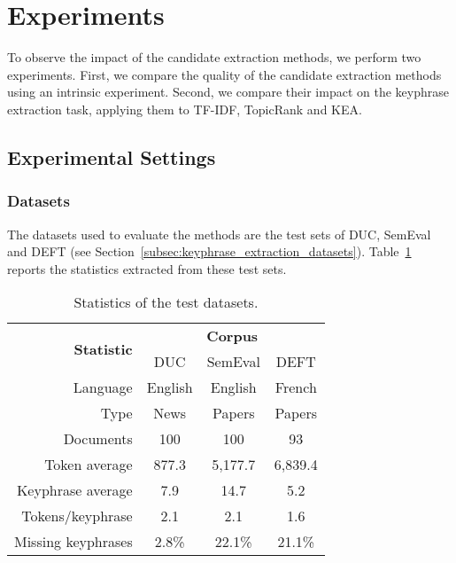 \section{Experiments}
\label{sec:evaluation}
  To observe the impact of the candidate extraction methods, we perform two
  experiments. First, we compare the quality of the candidate extraction methods
  using an intrinsic experiment. Second, we compare their impact on the
  keyphrase extraction task, applying them to TF-IDF, TopicRank and KEA.

  \subsection{Experimental Settings}
  \label{subsec:evaluation_settings}
    \subsubsection{Datasets}
    \label{subsubsec:datasets}
      The datasets used to evaluate the methods are the test sets of DUC,
      SemEval and DEFT (see Section~\ref{subsec:keyphrase_extraction_datasets}).
      Table~\ref{tab:test_dataset_statistics} reports the statistics extracted
      from these test sets.
      \begin{table}
        \centering
        \begin{tabular}{@{~}r@{~}c@{~}c@{~}c@{~}}
          \toprule
          \multirow{2}{*}[-2pt]{\textbf{Statistic}} & \multicolumn{3}{c}{\textbf{Corpus}}\\
          \cmidrule{2-4}
          & DUC & SemEval & DEFT\\
          \midrule
          Language & English & English & French\\
          Type & News & Papers & Papers\\
          Documents & 100 & 100 & 93\\
          Token average & 877.3 & 5,177.7 & 6,839.4\\
          Keyphrase average & 7.9 & 14.7 & 5.2\\
          Tokens/keyphrase & 2.1 & 2.1 & 1.6\\
          Missing keyphrases & 2.8\% & 22.1\% & 21.1\% \\
          \bottomrule
        \end{tabular}
        \caption{Statistics of the test datasets.
                 \label{tab:test_dataset_statistics}}
      \end{table}

